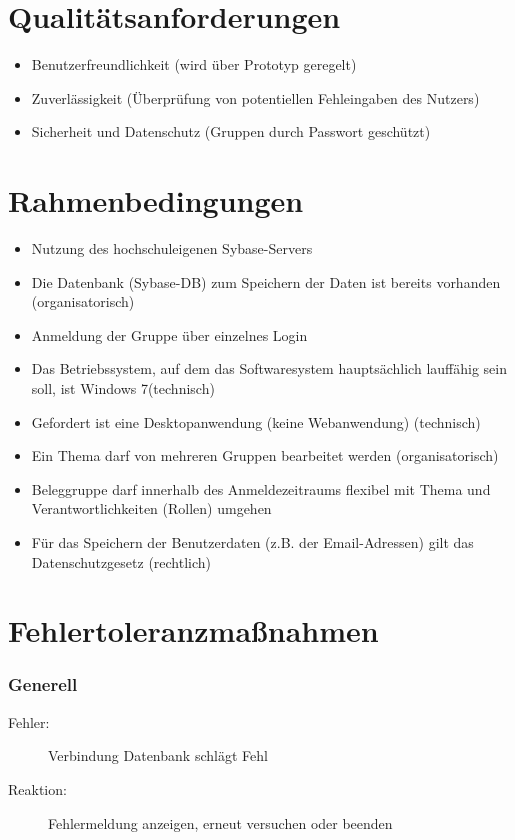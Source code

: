 \documentclass{article}
\begin{document}

\newpage
\part{Qualitätsanforderungen}
\begin{itemize}
\item Benutzerfreundlichkeit (wird über Prototyp geregelt)
\item Zuverlässigkeit (Überprüfung von potentiellen Fehleingaben des Nutzers)
\item Sicherheit und Datenschutz (Gruppen durch Passwort geschützt)
\end{itemize}

\newpage
\part{Rahmenbedingungen}
\begin{itemize}
\item Nutzung des hochschuleigenen Sybase-Servers
\item Die Datenbank (Sybase-DB) zum Speichern der Daten ist bereits vorhanden
(organisatorisch)
\item Anmeldung der Gruppe über einzelnes Login
\item Das Betriebssystem, auf dem das Softwaresystem hauptsächlich lauffähig
sein soll, ist Windows 7(technisch)
\item Gefordert ist eine Desktopanwendung (keine Webanwendung) (technisch)
\item Ein Thema darf von mehreren Gruppen bearbeitet werden (organisatorisch)
\item Beleggruppe darf innerhalb des Anmeldezeitraums flexibel mit Thema und Verantwortlichkeiten (Rollen) umgehen
\item Für das Speichern der Benutzerdaten (z.B. der Email-Adressen) gilt das
Datenschutzgesetz (rechtlich)
\end{itemize}

\newpage
\part{Fehlertoleranzmaßnahmen}

\section{Generell}
\begin{description}
\item[Fehler:] Verbindung Datenbank schlägt Fehl
\item[Reaktion:] Fehlermeldung anzeigen, erneut versuchen oder beenden
\end{description}
\end{document}

